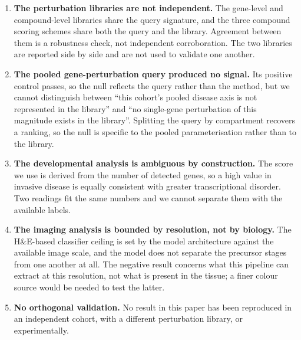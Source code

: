 \begin{enumerate}
\item \textbf{The perturbation libraries are not independent.} The gene-level and
compound-level libraries share the query signature, and the three compound scoring schemes
share both the query and the library. Agreement between them is a robustness check, not
independent corroboration. The two libraries are reported side by side and are not used to
validate one another.

\item \textbf{The pooled gene-perturbation query produced no signal.} Its positive control
passes, so the null reflects the query rather than the method, but we cannot distinguish
between ``this cohort's pooled disease axis is not represented in the library'' and ``no
single-gene perturbation of this magnitude exists in the library''. Splitting the query by
compartment recovers a ranking, so the null is specific to the pooled parameterisation
rather than to the library.

\item \textbf{The developmental analysis is ambiguous by construction.} The score we use
is derived from the number of detected genes, so a high value in invasive disease is
equally consistent with greater transcriptional disorder. Two readings fit the same
numbers and we cannot separate them with the available labels.

\item \textbf{The imaging analysis is bounded by resolution, not by biology.} The
H\&E-based classifier ceiling is set by the model architecture against the available image
scale, and the model does not separate the precursor stages from one another at all. The
negative result concerns what this pipeline can extract at this resolution, not what is
present in the tissue; a finer colour source would be needed to test the latter.

\item \textbf{No orthogonal validation.} No result in this paper has been reproduced in an
independent cohort, with a different perturbation library, or experimentally.

\end{enumerate}
